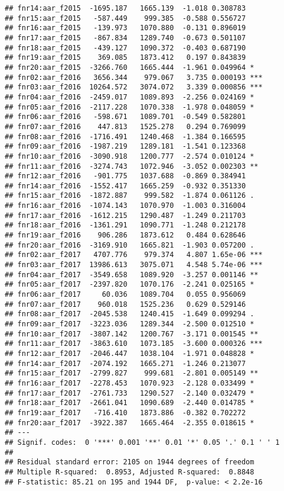\documentclass[
]{article}
\begin{document}
\begin{verbatim}
## fnr14:aar_f2015  -1695.187   1665.139  -1.018 0.308783    
## fnr15:aar_f2015   -587.449    999.385  -0.588 0.556727    
## fnr16:aar_f2015   -139.973   1070.880  -0.131 0.896019    
## fnr17:aar_f2015   -867.834   1289.740  -0.673 0.501107    
## fnr18:aar_f2015   -439.127   1090.372  -0.403 0.687190    
## fnr19:aar_f2015    369.085   1873.412   0.197 0.843839    
## fnr20:aar_f2015  -3266.760   1665.444  -1.961 0.049964 *  
## fnr02:aar_f2016   3656.344    979.067   3.735 0.000193 ***
## fnr03:aar_f2016  10264.572   3074.072   3.339 0.000856 ***
## fnr04:aar_f2016  -2459.017   1089.893  -2.256 0.024169 *  
## fnr05:aar_f2016  -2117.228   1070.338  -1.978 0.048059 *  
## fnr06:aar_f2016   -598.671   1089.701  -0.549 0.582801    
## fnr07:aar_f2016    447.813   1525.278   0.294 0.769099    
## fnr08:aar_f2016  -1716.491   1240.468  -1.384 0.166595    
## fnr09:aar_f2016  -1987.219   1289.181  -1.541 0.123368    
## fnr10:aar_f2016  -3090.918   1200.777  -2.574 0.010124 *  
## fnr11:aar_f2016  -3274.743   1072.946  -3.052 0.002303 ** 
## fnr12:aar_f2016   -901.775   1037.688  -0.869 0.384941    
## fnr14:aar_f2016  -1552.417   1665.259  -0.932 0.351330    
## fnr15:aar_f2016  -1872.887    999.582  -1.874 0.061126 .  
## fnr16:aar_f2016  -1074.143   1070.970  -1.003 0.316004    
## fnr17:aar_f2016  -1612.215   1290.487  -1.249 0.211703    
## fnr18:aar_f2016  -1361.291   1090.771  -1.248 0.212178    
## fnr19:aar_f2016    906.286   1873.612   0.484 0.628646    
## fnr20:aar_f2016  -3169.910   1665.821  -1.903 0.057200 .  
## fnr02:aar_f2017   4707.776    979.374   4.807 1.65e-06 ***
## fnr03:aar_f2017  13986.613   3075.071   4.548 5.74e-06 ***
## fnr04:aar_f2017  -3549.658   1089.920  -3.257 0.001146 ** 
## fnr05:aar_f2017  -2397.820   1070.176  -2.241 0.025165 *  
## fnr06:aar_f2017     60.036   1089.704   0.055 0.956069    
## fnr07:aar_f2017    960.018   1525.236   0.629 0.529146    
## fnr08:aar_f2017  -2045.538   1240.415  -1.649 0.099294 .  
## fnr09:aar_f2017  -3223.036   1289.344  -2.500 0.012510 *  
## fnr10:aar_f2017  -3807.142   1200.767  -3.171 0.001545 ** 
## fnr11:aar_f2017  -3863.610   1073.185  -3.600 0.000326 ***
## fnr12:aar_f2017  -2046.447   1038.104  -1.971 0.048828 *  
## fnr14:aar_f2017  -2074.192   1665.271  -1.246 0.213077    
## fnr15:aar_f2017  -2799.827    999.681  -2.801 0.005149 ** 
## fnr16:aar_f2017  -2278.453   1070.923  -2.128 0.033499 *  
## fnr17:aar_f2017  -2761.733   1290.527  -2.140 0.032479 *  
## fnr18:aar_f2017  -2661.041   1090.689  -2.440 0.014785 *  
## fnr19:aar_f2017   -716.410   1873.886  -0.382 0.702272    
## fnr20:aar_f2017  -3922.387   1665.464  -2.355 0.018615 *  
## ---
## Signif. codes:  0 '***' 0.001 '**' 0.01 '*' 0.05 '.' 0.1 ' ' 1
## 
## Residual standard error: 2105 on 1944 degrees of freedom
## Multiple R-squared:  0.8953, Adjusted R-squared:  0.8848 
## F-statistic: 85.21 on 195 and 1944 DF,  p-value: < 2.2e-16
\end{verbatim}
\end{document}
